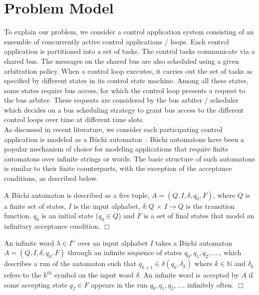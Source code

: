 \section{Problem Model} \label{sec3}
\noindent
To explain our problem, we consider a control application system consisting of an ensemble of concurrently active control applications / loops. Each control application is partitioned into a set of
tasks. The control tasks communicate via a shared bus. The messages on the shared bus are also scheduled using a given arbitration policy. When a control loop executes, it carries out the set of tasks as specified by different states in its control state machine. Among all these states, some
states require bus access, for which the control loop presents a request to the bus arbiter. These requests are considered by the bus arbiter / scheduler which decides on a bus scheduling strategy to grant bus access to the different control loops over time at different time slots. \\

\noindent
As discussed in recent literature, we consider each participating control application is modeled as a B\"{u}chi automaton~\cite{leeuwen90/Thomas90}. B\"{u}chi automatons have been a popular mechanism of choice for modeling applications that require finite automatons over infinite strings or words. The basic structure of such automatons is similar to their finite counterparts, with the exception of the acceptance conditions, as described below.
\begin{definition}
A B\"{u}chi automaton is described as a five tuple, 
$A = (Q,I,\delta,q_0,F)$, where $Q$ is a finite set of states, $I$ is the input alphabet, $\delta : Q$ $\times$ $I \rightarrow Q $ is the transition function, $q_0$ 
is an initial state ($q_0 \in Q$) and $F$ is a set of final states that model an infinitary acceptance condition. $\Box$ 
\end{definition}

\begin{definition}
An infinite word $\lambda \in I ^ \omega$ over an input alphabet $I$ takes a B\"{u}chi automaton $A = (Q,I,\delta,q_0,F)$ through an infinite sequence of states $ q_0, q_1, q_2, ....$, which describes a run of
the automaton such that $ q_{k+1} \in \delta(q_k, \delta_k)$ where $k \in \mathbb{N}$ and $\delta_k$ refers to the $k^{th}$ symbol on the input word $\delta$. An infinite word is accepted by $A$ if some 
accepting state $q_f \in F $ appears in the run $ q_0, q_1, q_2, ....$ 
infinitely often. $\Box$ 
\end{definition}

